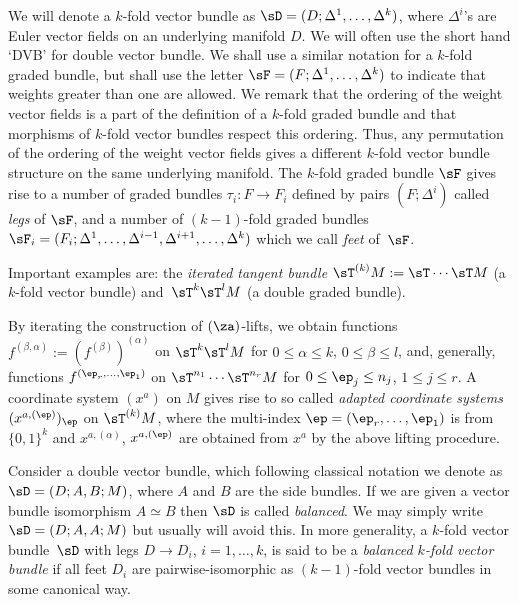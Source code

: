 We will denote a $k$-fold vector bundle as $\sD = (D; \Delta^1, \ldots, \Delta^k)$, where $\Delta^i$'s are Euler vector f\/ields on an underlying manifold $D$. We will often use the short hand `DVB' for double vector bundle. We shall use a similar notation for a $k$-fold graded bundle, but shall use the letter $\sF = (F; \Delta^1, \ldots, \Delta^k)$ to indicate that weights greater than one are allowed. We remark that the ordering of the weight vector f\/ields is a part of the def\/inition of a $k$-fold graded bundle and that morphisms of $k$-fold vector bundles respect this ordering. Thus, any permutation of the ordering of the weight vector f\/ields gives a dif\/ferent $k$-fold vector bundle structure on the same underlying manifold. The $k$-fold graded bundle $\sF$ gives rise to a number of graded bundles $\tau_i\colon F\rightarrow F_i$ def\/ined by pairs $(F; \Delta^i)$ called \emph{legs} of $\sF$, and a number of $(k-1)$-fold graded bundles $\sF_i = (F_i; \Delta^1, \ldots, \Delta^{i-1}, \Delta^{i+1}, \ldots, \Delta^k)$ which we call \emph{feet} of~$\sF$.

Important examples are: the \emph{iterated tangent bundle} $\sT^{(k)} M:=\sT\cdots\sT M$ (a $k$-fold vector bundle) and~$\sT^k\sT^l M$ (a double graded bundle).

By iterating the construction of $(\za)$-lifts, we obtain functions $f^{(\beta, \alpha)} := (f^{(\beta)})^{(\alpha)}$ on $\sT^k \sT^l M$ for $0\leq \alpha\leq k$, $0\leq \beta\leq l$, and, generally, functions $f^{(\ep_r, \ldots, \ep_1)}$ on $\sT^{n_1} \cdots \sT^{n_r} M$ for $0\leq \ep_j\leq n_j$, $1\leq j\leq r$. A coordinate system $(x^a)$ on $M$ gives rise to so called \emph{adapted coordinate sys\-tems}~$(x^{a, (\ep)})_\ep$ on $\sT^{(k)} M$, where the multi-index $\ep=(\ep_r, \ldots, \ep_1)$ is from $\{0,1\}^k$ and $x^{a, (\alpha)}$, $x^{a, (\ep)}$ are obtained from $x^a$ by the above lifting procedure.

\begin{Definition}\label{def:symmetricVB}
Consider a double vector bundle, which following classical notation we denote as $\sD=(D; A, B; M)$, where $A$ and $B$ are the side bundles. If we are given a vector bundle isomorphism $A \simeq B$ then $\sD$ is called \emph{balanced}. We may simply write $\sD=(D; A, A; M)$ but usually will avoid this. In more generality, a $k$-fold vector bundle~$\sD$ with legs $D\rightarrow D_i$, $i=1, \ldots, k$, is said to be a \emph{balanced $k$-fold vector bundle} if all feet $D_i$ are pairwise-isomorphic as $(k-1)$-fold vector bundles in some canonical way.
\end{Definition}

